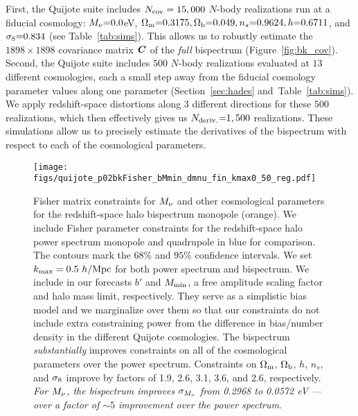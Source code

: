 First, the Quijote suite includes $N_{\rm cov} = 15,000$ $N$-body realizations run at a 
fiducial cosmology: $M_\nu{=}0.0$eV, $\Omega_{\rm m}{=}0.3175, \Omega_{\rm b}{=}0.049, 
n_s{=}0.9624, h{=}0.6711$, and $\sigma_8{=}0.834$ (see Table~\ref{tab:sims}). 
This allows us to robustly estimate the $1898\times1898$ covariance matrix 
$\textbf{\textit{C}}$ of the {\em full} bispectrum (Figure~\ref{fig:bk_cov}). Second, the 
Quijote suite includes $500$ $N$-body realizations evaluated at $13$ different 
cosmologies, each a small step away from the fiducial cosmology parameter 
values along one parameter (Section~\ref{sec:hades} and~Table~\ref{tab:sims}). 
We apply redshift-space distortions along 3 different directions for 
these $500$ realizations, which then effectively gives us $N_{\rm deriv.}{=}1,500$ 
realizations. These simulations allow us to precisely estimate the derivatives 
of the bispectrum with respect to each of the cosmological parameters. 

\begin{figure}
\begin{center}
    \texttt{[image: figs/quijote\_p02bkFisher\_bMmin\_dmnu\_fin\_kmax0\_50\_reg.pdf]} 
    \caption{Fisher matrix constraints for $M_\nu$ and other cosmological parameters 
        for the redshift-space halo bispectrum monopole (orange). We include Fisher
        parameter constraints for the redshift-space halo power spectrum monopole and 
        quadrupole in blue for comparison. The contours mark the $68\%$ and $95\%$ 
        confidence intervals.  We set $k_{\rm max} = 0.5~h/{\rm Mpc}$ for both power 
        spectrum and bispectrum. We include in our forecasts $b'$ and $M_{\rm min}$, a 
        free amplitude scaling factor and halo mass limit, respectively. They serve as 
        a simplistic bias model and we marginalize over them so that our constraints do 
        not include extra constraining power from the difference in bias/number density 
        in the different Quijote cosmologies. The bispectrum {\em substantially} 
        improves constraints on all of the cosmological parameters over the power 
        spectrum. Constraints on $\Omega_{\rm m}$, $\Omega_{\rm b}$, $h$, $n_s$, and $\sigma_8$ improve by
        factors of 1.9, 2.6, 3.1, 3.6, and 2.6, respectively. {\em For $M_\nu$, the
        bispectrum improves $\sigma_{M_\nu}$ from 0.2968 to 0.0572 eV --- over a
        factor of ${\sim}5$ improvement over the power spectrum}.}
\label{fig:bk_fish_05}
\end{center}
\end{figure}

